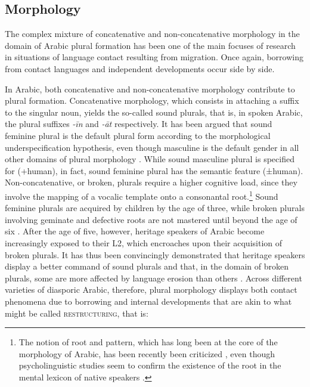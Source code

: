 \documentclass[output=paper]{langsci/langscibook}
\begin{document}
 
 \subsection{Morphology}


The complex mixture of concatenative and non-concatenative morphology in the domain of Arabic plural formation has been one of the main focuses of research in situations of language contact resulting from migration. Once again, borrowing from contact languages and independent developments occur side by side.

In Arabic, both concatenative and non-concatenative morphology contribute to plural formation. Concatenative morphology, which consists in attaching a suffix to the singular noun, yields the so-called sound plurals, that is, in spoken Arabic, the plural suffixes \textit{{}-īn} and \textit{{}-āt} respectively. It has been argued that sound feminine plural is the default plural form according to the morphological underspecification hypothesis, even though masculine is the default gender in all other domains of plural morphology \citep[855–856]{AlbiriniBenmamoun2014}. While sound masculine plural is specified for (+human), in fact, sound feminine plural has the semantic feature (±human). Non-concatenative, or broken, plurals require a higher cognitive load, since they involve the mapping of a vocalic template onto a consonantal root.\footnote{The notion of root and pattern, which has long been at the core of the morphology of Arabic, has been recently been criticized \citep{Ratcliffe2013}, even though psycholinguistic studies seem to confirm the existence of the root in the mental lexicon of native speakers \citep{Boudelaa2013}.} Sound feminine plurals are acquired by children by the age of three, while broken plurals involving geminate and defective roots are not mastered until beyond the age of six \citep[857–858]{AlbiriniBenmamoun2014}.  After the age of five, however, heritage speakers of Arabic become increasingly exposed to their L2, which encroaches upon their acquisition of broken plurals. It has thus been convincingly demonstrated that heritage speakers display a better command of sound plurals and that, in the domain of broken plurals, some are more affected by language erosion than others \citep[858–859]{AlbiriniBenmamoun2014}. Across different varieties of diasporic Arabic, therefore, plural morphology displays both contact phenomena due to borrowing and internal developments that are akin to what might be called \textsc{restructuring}, that is:
\end{document}
